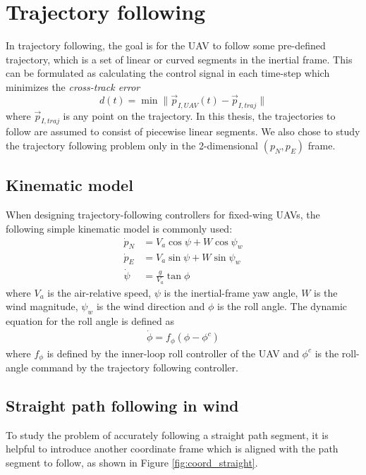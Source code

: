 \section{Trajectory following}
In trajectory following, the goal is for the UAV to follow some pre-defined trajectory, which is a set of 
linear or curved segments in the inertial frame. This can be formulated as calculating the control signal 
in each time-step which minimizes the \textit{cross-track error}
\begin{equation}
    d(t)=\min\|\vec{p}_{I,UAV}(t)-\vec{p}_{I,traj}\|
\end{equation}
where $\vec{p}_{I,traj}$ is any point on the trajectory. In this thesis, the trajectories to follow are 
assumed to consist of piecewise linear segments. We also chose to study the trajectory following problem 
only in the 2-dimensional $(p_N,p_E)$ frame.

\subsection{Kinematic model}
When designing trajectory-following controllers for fixed-wing UAVs, the following simple kinematic model is commonly used:
\begin{align}\label{eq:traj_model}
    \dot{p}_N &= V_a\cos\psi + W\cos\psi_w \\
    \dot{p}_E &= V_a\sin\psi + W\sin\psi_w \\
    \dot{\psi} &= \frac{g}{V_a}\tan\phi
\end{align}
where $V_a$ is the air-relative speed, $\psi$ is the inertial-frame yaw angle, $W$ is the wind magnitude, $\psi_w$ is the wind direction and $\phi$ is the roll angle. The dynamic equation for the roll angle is 
defined as
\begin{align}
    \dot{\phi} = f_\phi(\phi-\phi^c)
\end{align}
where $f_\phi$ is defined by the inner-loop roll controller of the UAV and $\phi^c$ is the roll-angle command by the
trajectory following controller.
\subsection{Straight path following in wind}\label{sec:straight_path_wind}
To study the problem of accurately following a straight path segment, it is helpful to introduce another 
coordinate frame which is aligned with the path segment to follow, as shown in Figure \ref{fig:coord_straight}.

